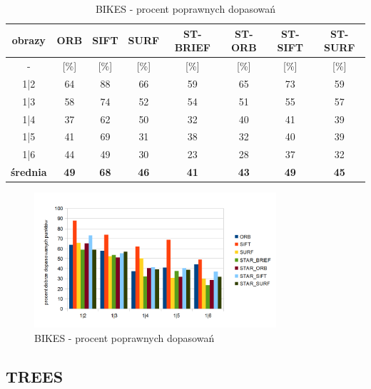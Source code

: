 \begin{table}[htbp]
  \centering
  \caption{BIKES - procent poprawnych dopasowań}
    \begin{tabular}{|c|c|c|c|c|c|c|c|}\hline
    obrazy & \textbf{ORB} & \textbf{SIFT} & \textbf{SURF} & \textbf{ST-BRIEF} & \textbf{ST-ORB} & \textbf{ST-SIFT} & \textbf{ST-SURF} \\\hline
     - & [\%] & [\%] & [\%] & [\%] & [\%] & [\%] & [\%] \\\hline
   1|2 & 64 & 88 & 66 & 59 & 65 & 73 & 59 \\
    1|3 & 58 & 74 & 52 & 54 & 51 & 55 & 57 \\
    1|4 & 37 & 62 & 50 & 32 & 40 & 41 & 39 \\
    1|5 & 41 & 69 & 31 & 38 & 32 & 40 & 39 \\
    1|6 & 44 & 49 & 30 & 23 & 28 & 37 & 32 \\\hline
    \textbf{średnia} & \textbf{49} & \textbf{68} & \textbf{46} & \textbf{41} & \textbf{43} & \textbf{49} & \textbf{45} \\\hline
    
    \end{tabular}%
  \label{tab:bikes_m2}%
\end{table}%


\begin{figure}
\centering
\includegraphics[width=0.8\textwidth]{pict/mikolajczyk/bikes/m2.png}
\caption{BIKES - procent poprawnych dopasowań}
\label{fig:bikes_m2}
\end{figure}








\newpage
\FloatBarrier
\subsection{TREES}

